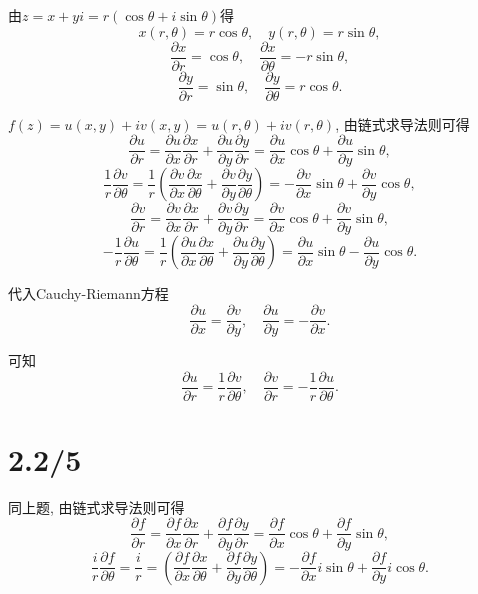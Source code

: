 \documentclass[11pt,a4paper]{article}
\begin{document}
由$z=x+yi=r(\cos\theta+i\sin\theta)$得
$$x(r,\theta)=r\cos\theta,\quad y(r,\theta)=r\sin\theta,$$
$$\frac{\partial x}{\partial r}=\cos\theta,\quad \frac{\partial x}{\partial \theta}=-r\sin\theta,$$
$$\frac{\partial y}{\partial r}=\sin\theta,\quad \frac{\partial y}{\partial \theta}=r\cos\theta.$$

$f(z)=u(x,y)+iv(x,y)=u(r,\theta)+iv(r,\theta)$, 由链式求导法则可得
$$\frac{\partial u}{\partial r}=\frac{\partial u}{\partial x}\frac{\partial x}{\partial r}+\frac{\partial u}{\partial y}\frac{\partial y}{\partial r}=\frac{\partial u}{\partial x}\cos\theta+\frac{\partial u}{\partial y}\sin\theta,$$
$$\frac{1}{r}\frac{\partial v}{\partial\theta}=\frac{1}{r}\left(\frac{\partial v}{\partial x}\frac{\partial x}{\partial\theta}+\frac{\partial v}{\partial y}\frac{\partial y}{\partial\theta}\right)=-\frac{\partial v}{\partial x}\sin\theta+\frac{\partial v}{\partial y}\cos\theta,$$
$$\frac{\partial v}{\partial r}=\frac{\partial v}{\partial x}\frac{\partial x}{\partial r}+\frac{\partial v}{\partial y}\frac{\partial y}{\partial r}=\frac{\partial v}{\partial x}\cos\theta+\frac{\partial v}{\partial y}\sin\theta,$$
$$-\frac{1}{r}\frac{\partial u}{\partial\theta}=\frac{1}{r}\left(\frac{\partial u}{\partial x}\frac{\partial x}{\partial\theta}+\frac{\partial u}{\partial y}\frac{\partial y}{\partial\theta}\right)=\frac{\partial u}{\partial x}\sin\theta-\frac{\partial u}{\partial y}\cos\theta.$$

代入Cauchy-Riemann方程
$$\frac{\partial u}{\partial x}=\frac{\partial v}{\partial y},\quad\frac{\partial u}{\partial y}=-\frac{\partial v}{\partial x}.$$

可知
$$\frac{\partial u}{\partial r}=\frac{1}{r}\frac{\partial v}{\partial\theta},\quad \frac{\partial v}{\partial r}=-\frac{1}{r}\frac{\partial u}{\partial\theta}.$$

\section{2.2/5}

同上题, 由链式求导法则可得
$$\frac{\partial f}{\partial r}=\frac{\partial f}{\partial x}\frac{\partial x}{\partial r}+\frac{\partial f}{\partial y}\frac{\partial y}{\partial r}=\frac{\partial f}{\partial x}\cos\theta+\frac{\partial f}{\partial y}\sin\theta,$$
$$\frac{i}{r}\frac{\partial f}{\partial\theta}=\frac{i}{r}=\left(\frac{\partial f}{\partial x}\frac{\partial x}{\partial\theta}+\frac{\partial f}{\partial y}\frac{\partial y}{\partial\theta}\right)=-\frac{\partial f}{\partial x}i\sin\theta+\frac{\partial f}{\partial y}i\cos\theta.$$
\end{document}
